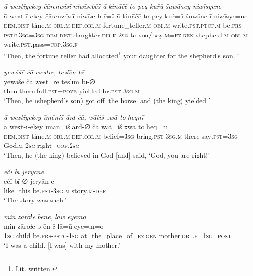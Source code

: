 \ea \label{KŠ.99}
\textit{ā wextīyekey čārenwīsī niwīsebēš ā kināčē to pey kuřū šuwāney niwīsyene} \\ 
\gll ā wext-ī-ekey čārenwīs-ī niwīse b-ē=š ā kināčē to pey kuř=ū šuwāne-ī niwīsye=ne \\ 
 \textsc{dem.dist} time\textsc{.m}\textsc{-obl}\textsc{.m}\textsc{-def}\textsc{.obl}\textsc{.m} fortune\_teller\textsc{.m}\textsc{-obl}\textsc{.m} write\textsc{.pst}\textsc{.ptcp}\textsc{.m} be\textsc{.prs}\textsc{-pstc}\textsc{.3sg}\textsc{=3sg} \textsc{dem.dist} daughter\textsc{.dir}\textsc{.f} \textsc{2sg} to son/boy\textsc{.m}\textsc{\textsc{=ez.gen}} shepherd\textsc{.m}\textsc{-obl}\textsc{.m} write\textsc{.pst}.pass\textsc{=cop}\textsc{.3sg}\textsc{.f} \\ 
\glt `Then, the fortune teller had allocated\footnote{Lit. written.} your daughter for the shepherd’s son. '
\z 
 
\ea \label{KŠ.103}
\textit{yewāšē čā westre, teslīm bī} \\ 
\gll yewāšē čā west=re teslīm bī-∅ \\ 
 then there fall\textsc{.pst}\textsc{=\textsc{povb}} yielded be\textsc{.pst}\textsc{-3sg}\textsc{.m} \\ 
\glt `Then, he (shepherd’s son) got off [the horse] and (the king) yielded  '
\z 
 
\ea \label{KŠ.104}
\textit{ā wextīyekey īmāniš ārd čā, wātiš xwā to heqnī} \\ 
\gll ā wext-ī-ekey īmān=iš ārd-∅ čā wāt=iš xwā to heq=nī \\ 
 \textsc{dem.dist} time\textsc{.m}\textsc{-obl}\textsc{.m}\textsc{-def}\textsc{.obl}\textsc{.m} belief\textsc{=3sg} bring\textsc{.pst}\textsc{-3sg}\textsc{.m} there say\textsc{.pst}\textsc{=3sg} God\textsc{.m} \textsc{2sg} right\textsc{=cop}\textsc{.\textsc{2sg}} \\ 
\glt `Then, he (the king) believed in God [and] said, ‘God, you are right!'
\z 
 
\ea \label{KŠ.106}
\textit{ečī bī jeryāne} \\ 
\gll ečī bī-∅ jeryān-e \\ 
 like\_this be\textsc{.pst}\textsc{-3sg}\textsc{.m} story\textsc{.m}\textsc{-def} \\ 
\glt `The story was such.'
\z 
 
\ea \label{ŽH.1}
\textit{min zāroɫe bēnē, lāw eyemo} \\ 
\gll min zāroɫe b-ēn-ē lā=ū eye=m=o \\ 
 \textsc{1sg} child be\textsc{.prs}\textsc{-pstc}\textsc{-1sg} at\_the\_place\_of\textsc{=ez}\textsc{.gen} mother\textsc{.obl}\textsc{\textsc{.f}}\textsc{=1sg}\textsc{=\textsc{post}} \\ 
\glt `I was a child. [I was] with my mother.'
\z 
 
